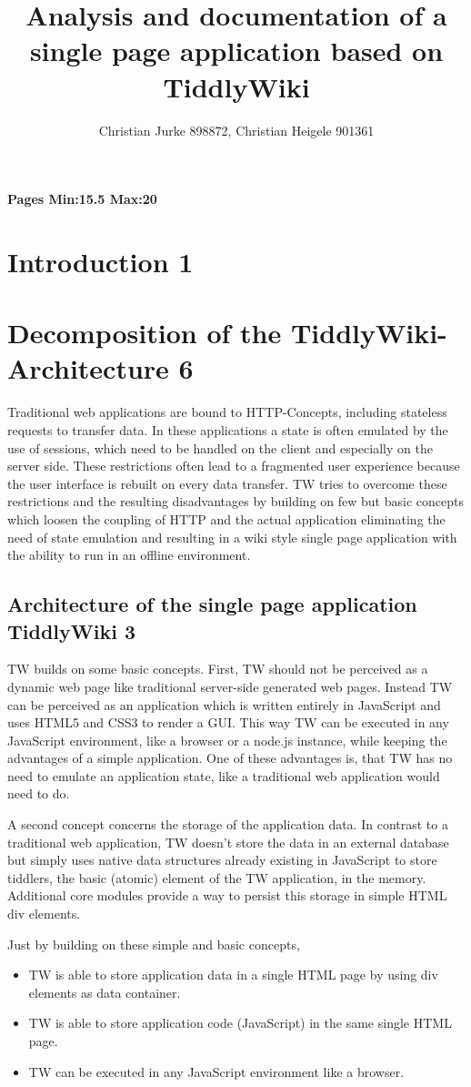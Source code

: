 \documentclass[12pt,a4paper]{scrartcl}
\title{Analysis and documentation of a single page application based on TiddlyWiki}
\author{Christian Jurke 898872, Christian Heigele 901361}
\begin{document}
\maketitle
\tableofcontents
\textbf{Pages Min:15.5 Max:20 }
\section{Introduction 1}
\section{Decomposition of the TiddlyWiki-Architecture 6}
Traditional web applications are bound to HTTP-Concepts, including stateless requests to transfer data. In these applications a state is often emulated by the use of sessions, which need to be handled on the client and especially on the server side.
These restrictions often lead to a fragmented user experience because the user interface is rebuilt on every data transfer.
TW tries to overcome these restrictions and the resulting disadvantages by building on few but basic concepts which loosen the coupling of HTTP and the actual application eliminating the need of state emulation and resulting in a wiki style single page application with the ability to run in an offline environment.
\subsection{Architecture of the single page application TiddlyWiki 3}
TW builds on some basic concepts. First, TW should not be perceived as a dynamic web page like traditional server-side generated web pages. Instead TW can be perceived as an application which is written entirely in JavaScript and uses HTML5 and CSS3 to render a GUI. This way TW can be executed in any JavaScript environment, like a browser or a node.js instance, while keeping the advantages of a simple application.
One of these advantages is, that TW has no need to emulate an application state, like a traditional web application would need to do.

A second concept concerns the storage of the application data. In contrast to a traditional web application, TW doesn't store the data in an external database but simply uses native data structures already existing in JavaScript to store tiddlers, the basic (atomic) element of the TW application, in the memory. Additional core modules provide a way to persist this storage in simple HTML div elements.

Just by building on these simple and basic concepts,
\begin{itemize}
\item TW is able to store application data in a single HTML page by using div elements as data container.
\item TW is able to store application code (JavaScript) in the same single HTML page.
\item TW can be executed in any JavaScript environment like a browser.
\end{itemize}
\end{document}
